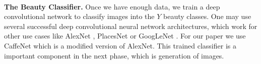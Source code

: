 








\mbox{} \\
\noindent
\textbf{The Beauty Classifier.}
Once we have enough data, we train a deep convolutional network %
to classify images into the $Y$ beauty classes. One may use several successful deep convolutional neural network architectures, which work for other use cases like AlexNet \cite{krizhevsky2012imagenet} , PlacesNet \cite{zhou2014learning} or GoogLeNet \cite{szegedy2015going}.  For our paper we use CaffeNet which is a modified version of AlexNet. This trained classifier is a important component in the next phase, which is generation of images. 

